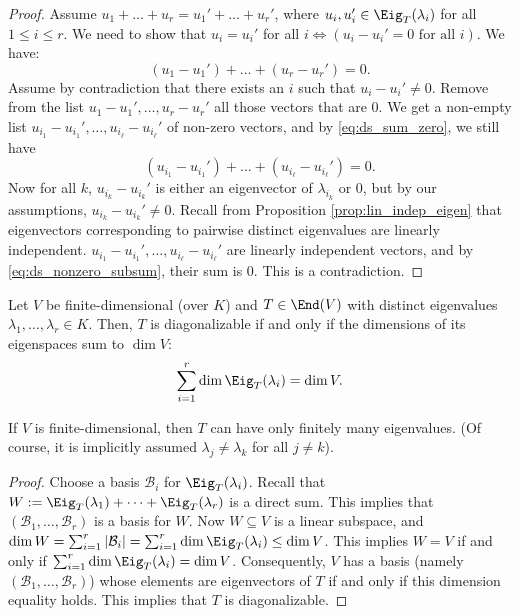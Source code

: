 \begin{proof}
  Assume $u_1 + \dots + u_r = u_1' + \dots + u_r'$, where $u_i, u_i' \in \Eig_T(\lambda_i)$ for all $1 \le i \le r$. We need to show that $u_i = u_i'$ for all $i \iff (u_i - u_i' = 0 \text{ for all } i)$.
  We have:
  \begin{equation} \label{eq:ds_sum_zero}
    (u_1 - u_1') + \dots + (u_r - u_r') = 0.
  \end{equation}
  Assume by contradiction that there exists an $i$ such that $u_i - u_i' \ne 0$.
  Remove from the list $u_1 - u_1', \dots, u_r - u_r'$ all those vectors that are 0. We get a non-empty list $u_{i_1} - u_{i_1}', \dots, u_{i_\ell} - u_{i_\ell}'$ of non-zero vectors, and by \eqref{eq:ds_sum_zero}, we still have
  \begin{equation} \label{eq:ds_nonzero_subsum}
    (u_{i_1} - u_{i_1}') + \dots + (u_{i_\ell} - u_{i_\ell}') = 0.
  \end{equation}
  Now for all $k$, $u_{i_k} - u_{i_k}'$ is either an eigenvector of $\lambda_{i_k}$ or 0, but by our assumptions, $u_{i_k} - u_{i_k}' \ne 0$.
  Recall from Proposition \ref{prop:lin_indep_eigen} that eigenvectors corresponding to pairwise distinct eigenvalues are linearly independent. $u_{i_1} - u_{i_1}', \dots, u_{i_\ell} - u_{i_\ell}'$ are linearly independent vectors, and by \eqref{eq:ds_nonzero_subsum}, their sum is 0. This is a contradiction.
\end{proof}

\begin{corollary}\label{cor:diagonalizability_eigenspaces}
  Let $V$ be finite-di\-men\-sional (over $K$) and $T \in \End(V)$ with distinct eigenvalues $\lambda_1, \dots, \lambda_r \in K$. Then, $T$ is diagonalizable if and only if the dimensions of its eigenspaces sum to $\dim V$:
  \[ \sum_{i=1}^r \dim \Eig_T(\lambda_i) = \dim V. \]
\end{corollary}

\begin{exercise}\label{ex:finite_eigenvalues}
  If $V$ is finite-dimensional, then $T$ can have only finitely many eigenvalues. (Of course, it is implicitly assumed $\lambda_j \ne \lambda_k$ for all $j \ne k$).
\end{exercise}

\begin{proof}
  Choose a basis $\mathcal{B}_i$ for $\Eig_T(\lambda_i)$. Recall that $W := \Eig_T(\lambda_1) + \dots + \Eig_T(\lambda_r)$ is a direct sum.
  This implies that $(\mathcal{B}_1, \dots, \mathcal{B}_r)$ is a basis for $W$.
  Now $W \subseteq V$ is a linear subspace, and $\dim W = \sum_{i=1}^r |\mathcal{B}_i| = \sum_{i=1}^r \dim \Eig_T(\lambda_i) \le \dim V$.
  This implies $W = V$ if and only if $\sum_{i=1}^r \dim \Eig_T(\lambda_i) = \dim V$. Consequently, $V$ has a basis (namely $(\mathcal{B}_1, \dots, \mathcal{B}_r)$) whose elements are eigenvectors of $T$ if and only if this dimension equality holds. This implies that $T$ is diagonalizable.
\end{proof}

